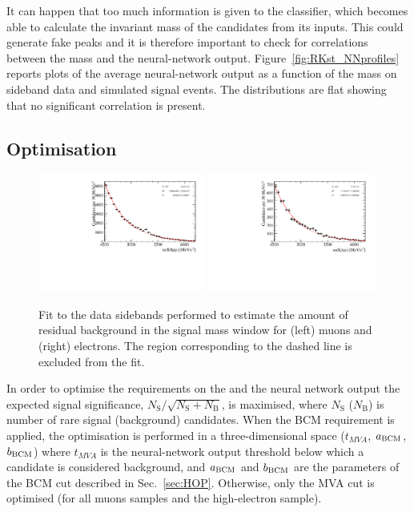 It can happen that too much information is given to the classifier, which becomes able to 
calculate the invariant mass of the candidates from its inputs. This could generate fake peaks and it is therefore
important to check for correlations between the \Bz mass and the neural-network output. Figure~\ref{fig:RKst_NNprofiles} reports
plots of the average neural-network output as a function of the \Bz mass on sideband data and simulated signal events.
The distributions are flat showing that no significant correlation is present.


\subsection{Optimisation}
\label{sec:optimisation}

\begin{figure}[t!]
\centering
\includegraphics[width=0.49\textwidth]{RKst/figs/Optimisation/optimizeCut_MM-q2central/fitB_MM_0.pdf}
\includegraphics[width=0.49\textwidth]{RKst/figs/Optimisation/optimizeCut_EE-q2central/fitB_EE_0.pdf}
\caption{Fit to the data sidebands performed to estimate the amount of residual background in the
signal mass window for (left) muons and (right) electrons. The region corresponding to the dashed line is excluded from the fit.}
\label{fig:sideband_fit}
\end{figure}

In order to optimise the requirements on the \mbcm and the neural network output the expected
signal significance, $N_{\mathrm{S}}/\sqrt{N_{\mathrm{S}}+N_{\mathrm{B}}}$, is maximised,
where $N_\mathrm{S}$ ($N_\mathrm{B}$) is number of rare signal (background) candidates.
When the BCM requirement is applied, the optimisation is performed in a three-dimensional space
($t_{MVA}$, $a_{\rm BCM}$, $b_{\rm BCM}$) where $t_{MVA}$ is the neural-network output threshold below which
a candidate is considered background, and $a_{\rm BCM}$ and $b_{\rm BCM}$ are the parameters of the BCM
cut described in Sec.~\ref{sec:HOP}. Otherwise, only the MVA cut is optimised 
(for all muons samples and the high-\qsq electron sample).

